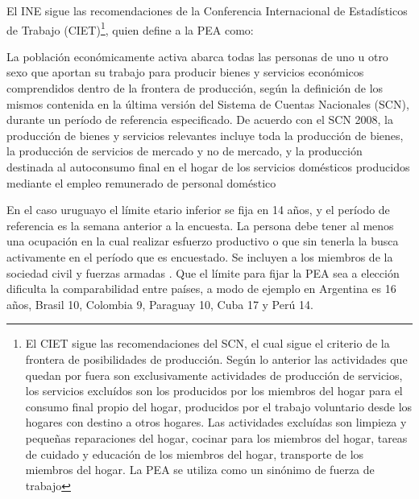 \documentclass[msc,oneside,a4paper]{udelar} %
\begin{document}
  El INE sigue las recomendaciones de la Conferencia Internacional de Estadísticos de Trabajo (CIET)\footnote{El CIET sigue las recomendaciones del SCN, el cual sigue el criterio de la frontera de posibilidades de producción. Según lo anterior las actividades que quedan por fuera son exclusivamente actividades de producción de servicios, los servicios excluídos son los producidos por los miembros del hogar para el consumo final propio del hogar, producidos por el trabajo voluntario desde los hogares con destino a otros hogares. Las actividades excluídas son limpieza y pequeñas reparaciones del hogar, cocinar para los miembros del hogar, tareas de cuidado y educación de los miembros del hogar, transporte de los miembros del hogar. La PEA se utiliza como un sinónimo de fuerza de trabajo}, quien define a la PEA como:
  \begin{center}
  \begin{minipage}{0.95\linewidth}
      \vspace{1pt}%
      {\small
      La población económicamente activa abarca todas las personas de
      uno u otro sexo que aportan su trabajo para producir bienes y servicios
      económicos comprendidos dentro de la frontera de producción, según
      la definición de los mismos contenida en la última versión del Sistema
      de Cuentas Nacionales (SCN), durante un período de referencia
      especificado. De acuerdo con el SCN 2008, la producción de bienes y
      servicios relevantes incluye toda la producción de bienes, la producción
      de servicios de mercado y no de mercado, y la producción destinada al
      autoconsumo final en el hogar de los servicios domésticos producidos
      mediante el empleo remunerado de personal doméstico
      }
      \vspace{1pt}%
  \end{minipage}
  \end{center}
  En el caso uruguayo el límite etario inferior se fija en 14 años, y el período de referencia es la semana anterior a la encuesta. La persona debe tener al menos una ocupación en la cual realizar esfuerzo productivo o que sin tenerla la busca activamente en el período que es encuestado. Se incluyen a los miembros de la sociedad civil y fuerzas armadas \cite{INE2018}. Que el límite para fijar la PEA sea a elección dificulta la comparabilidad entre países, a modo de ejemplo en Argentina es 16 años, Brasil 10, Colombia 9, Paraguay 10, Cuba 17 y Perú 14.
  
\end{document}
